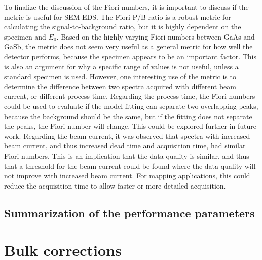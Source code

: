 To finalize the discussion of the Fiori numbers, it is important to discuss if the metric is useful for SEM EDS.
The Fiori P/B ratio is a robust metric for calculating the signal-to-background ratio, but it is highly dependent on the specimen and $E_0$.
Based on the highly varying Fiori numbers between GaAs and GaSb, the metric does not seem very useful as a general metric for how well the detector performs, because the specimen appears to be an important factor.
This is also an argument for why a specific range of values is not useful, unless a standard specimen is used.
However, one interesting use of the metric is to determine the difference between two spectra acquired with different beam current, or different process time.
Regarding the process time, the Fiori numbers could be used to evaluate if the model fitting can separate two overlapping peaks, because the background should be the same, but if the fitting does not separate the peaks, the Fiori number will change.
This could be explored further in future work.
Regarding the beam current, it was observed that spectra with increased beam current, and thus increased dead time and acquisition time, had similar Fiori numbers.
This is an implication that the data quality is similar, and thus that a threshold for the beam current could be found where the data quality will not improve with increased beam current.
For mapping applications, this could reduce the acquisition time to allow faster or more detailed acquisition.





\subsection{Summarization of the performance parameters}
\label{discussion:summarization_of_the_performance_parameters}





\section{Bulk corrections}
\label{discussion:bulk_corrections}


